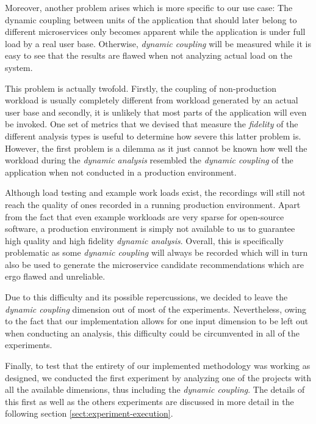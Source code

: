 \documentclass[12pt,a4paper]{report}
\begin{document}
Moreover, another problem arises which is more specific to
our use case: The dynamic coupling between units of the application that should
later belong to different microservices only becomes apparent while the application
is under full load by a real user base.
Otherwise, \textit{dynamic coupling} will be measured while it is easy to see
that the results are flawed when not analyzing actual load on the system.

This problem is actually twofold. Firstly, the coupling of non-production workload
is usually completely different from workload generated by an actual user base and
secondly, it is unlikely that most parts of the application will even be invoked.
One set of metrics that we devised that measure the \textit{fidelity} of the
different analysis types is useful to determine how severe this latter problem is.
However, the first problem is a dilemma as it just cannot be known how well the
workload during the \textit{dynamic analysis} resembled the \textit{dynamic coupling}
of the application when not conducted in a production environment.

Although load testing and example work loads exist, the recordings will still
not reach the quality of ones recorded in a running production environment.
Apart from the fact that even example workloads are very sparse for open-source
software, a production environment is simply not available to us to guarantee
high quality and high fidelity \textit{dynamic analysis}.
Overall, this is specifically problematic as some \textit{dynamic coupling} will always
be recorded which will in turn also be used to generate the microservice candidate
recommendations which are ergo flawed and unreliable.

Due to this difficulty and its possible repercussions, we decided to leave the
\textit{dynamic coupling} dimension out of most of the experiments.
Nevertheless, owing to the fact that our implementation allows for one input dimension
to be left out when conducting an analysis, this difficulty could be circumvented
in all of the experiments.

Finally, to test that the entirety of our implemented methodology was working as designed,
we conducted the first experiment by analyzing one of the projects with all the available
dimensions, thus including the \textit{dynamic coupling}. The details of this first as
well as the others experiments are discussed in more detail in the following section
\ref{sect:experiment-execution}.
\end{document}
